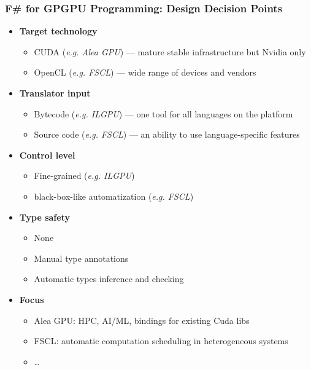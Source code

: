 \documentclass[xcolor=table,aspectratio=169]{beamer}
\begin{document}
\begin{frame}[fragile]
  \frametitle{F\# for GPGPU Programming: Design Decision Points}
  \begin{itemize}
    \item \textbf{Target technology}
    \begin{itemize}
      \item CUDA (\emph{e.g. Alea GPU}) --- mature stable infrastructure but Nvidia only
      \item OpenCL (\emph{e.g. FSCL}) --- wide range of devices and vendors
    \end{itemize}
    \item \textbf{Translator input}
    \begin{itemize}
      \item Bytecode (\emph{e.g. ILGPU}) --- one tool for all languages on the platform
      \item Source code (\emph{e.g. FSCL}) --- an ability to use language-specific features
    \end{itemize}
    \item \textbf{Control level}
    \begin{itemize}
      \item Fine-grained (\textit{e.g. ILGPU})
      \item black-box-like automatization (\textit{e.g. FSCL})
    \end{itemize}
    \item \textbf{Type safety}
    \begin{itemize} 
      \item None 
      \item Manual type annotations
      \item Automatic types inference and checking 
    \end{itemize}
    \item \textbf{Focus}
    \begin{itemize}
      \item Alea GPU: HPC, AI/ML, bindings for existing Cuda libs
      \item FSCL: automatic computation scheduling in heterogeneous systems
      \item \ldots
    \end{itemize}
  \end{itemize}
  
\end{frame}
\end{document}
